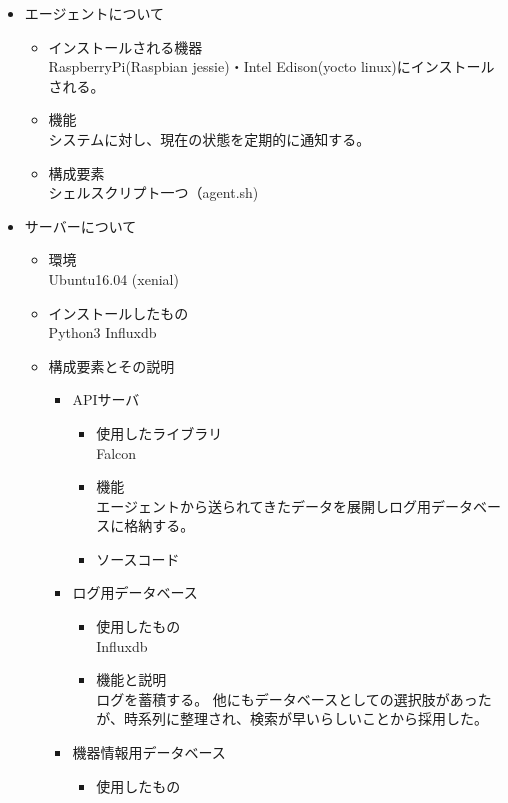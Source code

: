\begin{itemize}
	\item エージェントについて
		\begin{itemize}
			\item インストールされる機器\\
				RaspberryPi(Raspbian jessie)・Intel Edison(yocto linux)にインストールされる。
			\item 機能\\
				システムに対し、現在の状態を定期的に通知する。
			\item 構成要素\\
				シェルスクリプト一つ（agent.sh)
		\end{itemize}
	\item サーバーについて
		\begin{itemize}
			\item 環境\\
				Ubuntu16.04 (xenial)
			\item インストールしたもの\\
				Python3 Influxdb
			\item 構成要素とその説明
				\begin{itemize}
					\item APIサーバ
						\begin{itemize}
							\item 使用したライブラリ\\
								Falcon
							\item 機能\\
								エージェントから送られてきたデータを展開しログ用データベースに格納する。
							\item ソースコード\\
						\end{itemize}
					\item ログ用データベース
						\begin{itemize}
							\item 使用したもの\\
								Influxdb
							\item 機能と説明\\
								ログを蓄積する。
								他にもデータベースとしての選択肢があったが、時系列に整理され、検索が早いらしいことから採用した。
						\end{itemize}
					\item 機器情報用データベース
						\begin{itemize}
							\item 使用したもの\\

\end{itemize}
\end{itemize}
\end{itemize}
\end{itemize}

